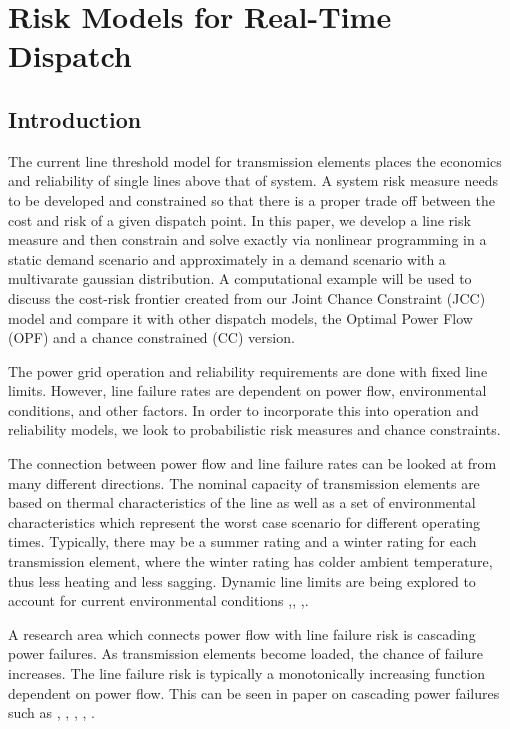 \newcommand{\mypathjcc}{../thesis/jcc}
\newcommand{\mypathjccdata}{../thesis/jcc/data}

\chapter{Risk Models for Real-Time Dispatch}
\section{Introduction}
The current line threshold model for transmission elements places the economics and reliability of single lines above that of system.  A system risk measure needs to be developed and constrained so that there is a proper trade off between the cost and risk of a given dispatch point.  In this paper, we develop a line risk measure and then constrain and solve exactly via nonlinear programming in a static demand scenario and approximately in a demand scenario with a multivarate gaussian distribution.  A computational example will be used to discuss the cost-risk frontier created from our Joint Chance Constraint (JCC) model and compare it with other dispatch models, the Optimal Power Flow (OPF) and a chance constrained (CC) version.  

The power grid operation and reliability requirements are done with fixed line limits.  However, line failure rates are dependent on power flow, environmental conditions, and other factors.  In order to incorporate this into operation and reliability models, we look to probabilistic risk measures and chance constraints. 

The connection between power flow and line failure rates can be looked at from many different directions.  The nominal capacity of transmission elements are based on thermal characteristics of the line as well as a set of environmental characteristics which represent the worst case scenario for different operating times.  Typically, there may be a summer rating and a winter rating for each transmission element, where the winter rating has colder ambient temperature, thus less heating and less sagging.  Dynamic line limits are being explored to account for current environmental conditions \cite{bucher_2013},\cite{yip_2009}, \cite{wang_2011},\cite{zhang_2002}.

A research area which connects power flow with line failure risk is cascading power failures.  As transmission elements become loaded, the chance of failure increases. The line failure risk is typically a monotonically increasing function dependent on power flow.  This can be seen in paper on cascading power failures such as \cite{carreras_2002}, \cite{chen_2005}, \cite{dobson_2007}, \cite{newman_2011}, \cite{hines_2011}.

